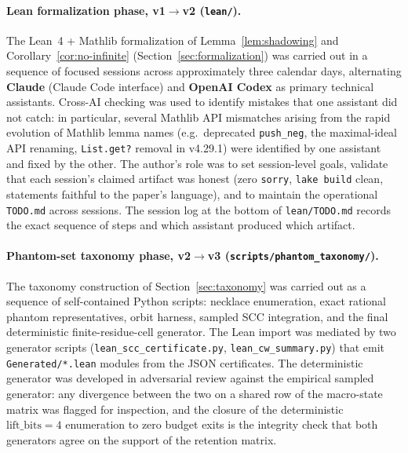 \documentclass[11pt,a4paper]{article}
\theoremstyle{definition}
\begin{document}
\paragraph{Lean formalization phase, v1$\to$v2
(\texttt{lean/}).}
The Lean~4 + Mathlib formalization of Lemma~\ref{lem:shadowing}
and Corollary~\ref{cor:no-infinite}
(Section~\ref{sec:formalization}) was carried out in a sequence
of focused sessions across approximately three calendar days,
alternating \textbf{Claude} (Claude Code interface) and
\textbf{OpenAI Codex} as primary technical assistants. Cross-AI
checking was used to identify mistakes that one assistant did
not catch: in particular, several Mathlib API mismatches arising
from the rapid evolution of Mathlib lemma names (e.g.\
deprecated \texttt{push\_neg}, the maximal-ideal API renaming,
\texttt{List.get?} removal in v4.29.1) were identified by one
assistant and fixed by the other. The author's role was to set
session-level goals, validate that each session's claimed
artifact was honest (zero \texttt{sorry}, \texttt{lake build}
clean, statements faithful to the paper's language), and to
maintain the operational \texttt{TODO.md} across sessions. The
session log at the bottom of \texttt{lean/TODO.md} records the
exact sequence of steps and which assistant produced which
artifact.

\paragraph{Phantom-set taxonomy phase, v2$\to$v3
(\texttt{scripts/phantom\_taxonomy/}).}
The taxonomy construction of Section~\ref{sec:taxonomy} was
carried out as a sequence of self-contained Python scripts:
necklace enumeration, exact rational phantom representatives,
orbit harness, sampled SCC integration, and the final
deterministic finite-residue-cell generator. The Lean import was
mediated by two generator scripts
(\texttt{lean\_scc\_certificate.py},
\texttt{lean\_cw\_summary.py}) that emit
\texttt{Generated/*.lean} modules from the JSON certificates. The
deterministic generator was developed in adversarial review
against the empirical sampled generator: any divergence between
the two on a shared row of the macro-state matrix was flagged
for inspection, and the closure of the deterministic
$\mathrm{lift\_bits} = 4$ enumeration to zero budget exits is
the integrity check that both generators agree on the support of
the retention matrix.
\end{document}
